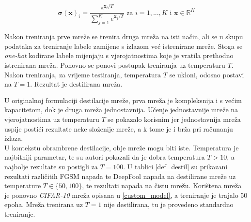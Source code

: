\documentclass[utf8, diplomski]{fer}
\begin{document}
\begin{equation}\label{softmax_t}
	\boldsymbol{\sigma}(\boldsymbol{x})_{i} = \frac{e^{\boldsymbol{x}_{i} / T}}{\sum_{j=1}^{K}e^{\boldsymbol{x}_{j} / T}} \text{ za } i = 1, ..., K \text{ i } \boldsymbol{x} \in \mathbb{R}^{K}
\end{equation}

Nakon treniranja prve mreže se trenira druga mreža na isti način, ali se u skupu podataka za treniranje labele zamijene s izlazom već istrenirane mreže. Stoga se \textit{one-hot} kodirane labele mijenjaju s vjerojatnostima koje je vratila prethodno istrenirana mreža. Ponovno se ponovi postupak treniranja uz temperaturu $T$. Nakon treniranja, za vrijeme testiranja, temperatura $T$ se ukloni, odosno postavi na $T = 1$. Rezultat je destilirana mreža. \par
U originalnoj formulaciji destilacije mreže, prva mreža je kompleksnija i s većim kapacitetom, dok je druga mreža jednostavnija. Učenje jednostavnije mreže na vjerojatnostima uz temperaturu $T$ se pokazalo korisnim jer jednostavnija mreža uspije postići rezultate neke složenije mreže, a k tome je i brža pri računanju izlaza. \\
U kontekstu obrambrene destilacije, obje mreže mogu biti iste. Temperatura je najbitniji parametar, te su autori pokazali da je dobra temperatura $T > 10$, a najbolje rezultate su postigli za $T = 100$. U tablici \ref{def_destil} su prikazani rezultati različitih FGSM napada te DeepFool napada na destilirane mreže uz temperature $T \in \{50, 100\}$, te rezultati napada na čistu mrežu. Korištena mreža je ponovno \textit{CIFAR-10} mreža opisana u \ref{custom_model}, a treniranje je trajalo $50$ epoha. Mreža trenirana uz $T = 1$ nije destilirana, tu je provedeno standardno treniranje.
\end{document}
